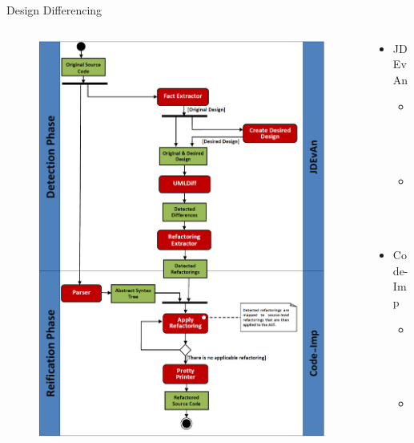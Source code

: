 \documentclass{beamer}
\begin{document}
\begin{frame}{Design Differencing}
  \begin{columns}[T]
    \begin{column}{.5\textwidth}
      \begin{figure}[t]
        \centering
        \includegraphics[width=0.8\linewidth]{bilder/designdiff.png}
      \end{figure}
    \end{column}
    \begin{column}{.5\textwidth}
      \begin{itemize}
        \item JDEvAn
        \begin{itemize}
          \item Item
          \item Item
        \end{itemize}
        \item Code-Imp
        \begin{itemize}
          \item Item
          \item Item
        \end{itemize}
      \end{itemize}
    \end{column}
  \end{columns} 
\end{frame}
\end{document}
